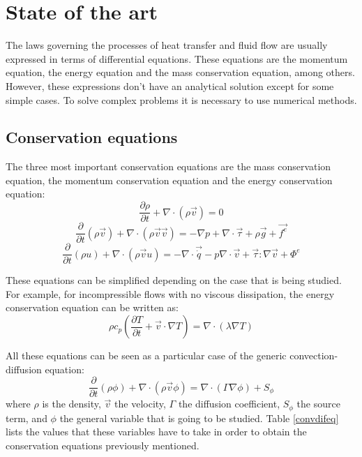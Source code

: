\chapter{State of the art}

The laws governing the processes of heat transfer and fluid flow are usually expressed in terms of differential equations. These equations are the momentum equation, the energy equation and the mass conservation equation, among others. However, these expressions don’t have an analytical solution except for some simple cases. To solve complex problems it is necessary to use numerical methods.

\section{Conservation equations}
\label{ConservationEquations}
The three most important conservation equations are the mass conservation equation, the momentum conservation equation and the energy conservation equation:
\begin{equation}
\frac{\partial\rho}{\partial t}+\nabla\cdot\left(\rho\vec{v}\right)=0
\end{equation}
\begin{equation}
\frac{\partial}{\partial t}\left(\rho\vec{v}\right)+\nabla\cdot\left(\rho\vec{v}\vec{v}\right)=-\nabla p+\nabla\cdot\vec{\tau}+\rho\vec{g}+\vec{f^{e}}
\end{equation}
\begin{equation}
\frac{\partial}{\partial t}(\rho u)+\nabla\cdot\left(\rho\vec{v}u\right)=-\nabla\cdot\vec{\dot{q}}-p\nabla\cdot\vec{v}+\vec{\tau}:\nabla\vec{v}+\Phi^{e}
\end{equation}

These equations can be simplified depending on the case that is being studied. For example, for incompressible flows with no viscous dissipation, the energy conservation equation can be written as:
\begin{equation}
\rho c_{p}\left(\frac{\partial T}{\partial t}+\vec{v}\cdot\nabla T\right)=\nabla\cdot\left(\lambda\nabla T\right)
\label{EnergyIncompNoVisc}
\end{equation}

All these equations can be seen as a particular case of the generic convection-diffusion equation:
\begin{equation}
\frac{\partial}{\partial t}\left(\rho\phi\right)+\nabla\cdot\left(\rho\vec{v}\phi\right)=\nabla\cdot\left(\Gamma\nabla\phi\right)+S_{\phi}
\end{equation}
where $\rho$ is the density, $\vec{v}$ the velocity, $\Gamma$ the diffusion coefficient, $S_{\phi}$ the source term, and $\phi$ the general variable that is going to be studied. Table \ref{convdifeq} lists the values that these variables have to take in order to obtain the conservation equations previously mentioned.

